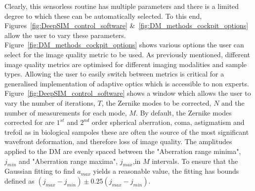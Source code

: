 Clearly, this sensorless routine has multiple parameters and there is a limited degree to which these can be automatically selected. To this end, Figures~\ref{fig:DeepSIM_control_software} \&~\ref{fig:DM_methods_cockpit_options} allow the user to vary these parameters. Figure~\ref{fig:DM_methods_cockpit_options} shows various options the user can select for the image quality metric to be used. As previously mentioned, different image quality metrics are optimised for different imaging modalities and sample types. Allowing the user to easily switch between metrics is critical for a generalised implementation of adaptive optics which is accessible to non experts. Figure~\ref{fig:DeepSIM_control_software} shows a window which allows the user to vary the number of iterations, $T$, the Zernike modes to be corrected, $N$ and the number of measurements for each mode, $M$. By default, the Zernike modes corrected for are $1^{st}$ and $2^{nd}$ order spherical aberration, coma, astigmatism and trefoil as in biological sampoles these are often the source of the most significant wavefront deformation, and therefore loss of image quality. The amplitudes applied to the DM are evenly spaced between the "Aberration range minima", $j_{min}$ and "Aberration range maxima", $j_{max}$,in $M$ intervals. To ensure that the Gaussian fitting to find $a_{max}$ yields a reasonable value, the fitting has bounds defined as $(j_{max}-j_{min}) \pm 0.25(j_{max}-j_{min})$.